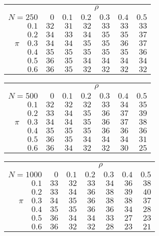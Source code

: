 \begin{tabular}{r|rrrrrr}
\hline\hline
 &\multicolumn{6}{c}{$\rho$} \\ 
 $N = 250$ & $0$ & $0.1$ & $0.2$ & $0.3$ & $0.4$ & $0.5$ \\ 
 \hline$0.1$ & $32$ & $31$ & $32$ & $33$ & $33$ & $33$\\ 
$0.2$ & $34$ & $33$ & $34$ & $35$ & $35$ & $37$\\ 
$\pi\quad$$0.3$ & $34$ & $34$ & $35$ & $35$ & $36$ & $37$\\ 
$0.4$ & $35$ & $35$ & $35$ & $35$ & $35$ & $36$\\ 
$0.5$ & $36$ & $35$ & $34$ & $34$ & $34$ & $34$\\ 
$0.6$ & $36$ & $35$ & $32$ & $32$ & $32$ & $32$\\ 
 \hline 
 \end{tabular}
 
 \vspace{2em} 
 
\begin{tabular}{r|rrrrrr}
\hline\hline
 &\multicolumn{6}{c}{$\rho$} \\ 
 $N = 500$ & $0$ & $0.1$ & $0.2$ & $0.3$ & $0.4$ & $0.5$ \\ 
 \hline$0.1$ & $32$ & $32$ & $32$ & $33$ & $34$ & $35$\\ 
$0.2$ & $33$ & $34$ & $35$ & $36$ & $37$ & $39$\\ 
$\pi\quad$$0.3$ & $34$ & $34$ & $35$ & $36$ & $37$ & $38$\\ 
$0.4$ & $35$ & $35$ & $35$ & $36$ & $36$ & $36$\\ 
$0.5$ & $36$ & $35$ & $34$ & $34$ & $34$ & $31$\\ 
$0.6$ & $36$ & $34$ & $32$ & $32$ & $30$ & $25$\\ 
 \hline 
 \end{tabular}
 
 \vspace{2em} 
 
\begin{tabular}{r|rrrrrr}
\hline\hline
 &\multicolumn{6}{c}{$\rho$} \\ 
 $N = 1000$ & $0$ & $0.1$ & $0.2$ & $0.3$ & $0.4$ & $0.5$ \\ 
 \hline$0.1$ & $33$ & $32$ & $33$ & $34$ & $36$ & $38$\\ 
$0.2$ & $33$ & $34$ & $36$ & $38$ & $39$ & $40$\\ 
$\pi\quad$$0.3$ & $34$ & $35$ & $36$ & $38$ & $38$ & $37$\\ 
$0.4$ & $35$ & $35$ & $36$ & $36$ & $34$ & $28$\\ 
$0.5$ & $36$ & $34$ & $34$ & $33$ & $27$ & $23$\\ 
$0.6$ & $36$ & $32$ & $32$ & $28$ & $23$ & $21$\\ 
 \hline 
 \end{tabular}
